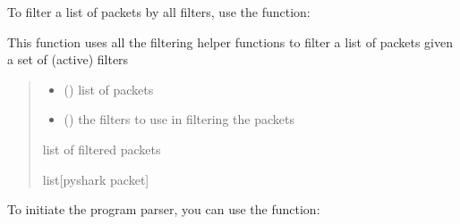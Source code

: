 \documentclass[letterpaper,10pt,english,openany,oneside]{sphinxmanual}
\begin{document}
\sphinxAtStartPar
To filter a list of packets by all filters, use
the  function:

\begin{fulllineitems}
\label{\detokenize{index:pktsniffer.filter_packets}}
\pysigstartsignatures
\pysiglinewithargsret
{}
{\sphinxparamcomma {}}
{}
\pysigstopsignatures
\sphinxAtStartPar
This function uses all the filtering helper functions to filter
a list of packets given a set of (active) filters
\begin{quote}\begin{description}
\begin{itemize}
\item {} 
\sphinxAtStartPar
{} (\sphinxstyleliteralemphasis{\sphinxupquote{{[}}}\sphinxstyleliteralemphasis{\sphinxupquote{{]}}}) \textendash{} list of packets

\item {} 
\sphinxAtStartPar
{} (\sphinxstyleliteralemphasis{\sphinxupquote{, }}) \textendash{} the filters to use in filtering the packets

\end{itemize}

\sphinxAtStartPar
list of filtered packets

\sphinxAtStartPar
list{[}pyshark packet{]}

\end{description}\end{quote}

\end{fulllineitems}


\sphinxAtStartPar
To initiate the program parser, you can use
the  function:
\end{document}
